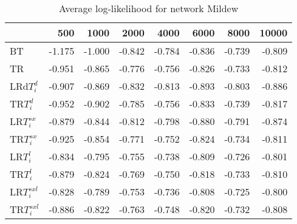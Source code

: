 \begin{table}
 \begin{center}
 \begin{tabular}{lrrrrrrr}
& 500 &  1000 & 2000 & 4000 & 6000& 8000&  10000\\\hline
BT & -1.175 & -1.000 & -0.842 & -0.784 & -0.836 & -0.739 & -0.809\\\hline
TR & -0.951 & -0.865 & -0.776 & -0.756 & -0.826 & -0.733 & -0.812\\\hline
LRd$T_i^d$ & -0.907 & -0.869 & -0.832 & -0.813 & -0.893 & -0.803 & -0.886\\\hline
TR$T_i^d$ & -0.952 & -0.902 & -0.785 & -0.756 & -0.833 & -0.739 & -0.817\\\hline
LR$T_i^{sx}$ & -0.879 & -0.844 & -0.812 & -0.798 & -0.880 & -0.791 & -0.874\\\hline
TR$T_i^{sx}$ & -0.925 & -0.854 & -0.771 & -0.752 & -0.824 & -0.734 & -0.811\\\hline
LR$T_i^l$ & -0.834 & -0.795 & -0.755 & -0.738 & -0.809 & -0.726 & -0.801\\\hline
TR$T_i^l$ & -0.879 & -0.824 & -0.769 & -0.750 & -0.818 & -0.733 & -0.810\\\hline
LR$T_i^{sxl}$ & -0.828 & -0.789 & -0.753 & -0.736 & -0.808 & -0.725 & -0.800\\\hline
TR$T_i^{sxl}$ & -0.886 & -0.822 & -0.763 & -0.748 & -0.820 & -0.732 & -0.808\\\hline
\end{tabular}
\end{center}
\caption{Average log-likelihood for network Mildew }
\label{Mildewll}
\end{table}


